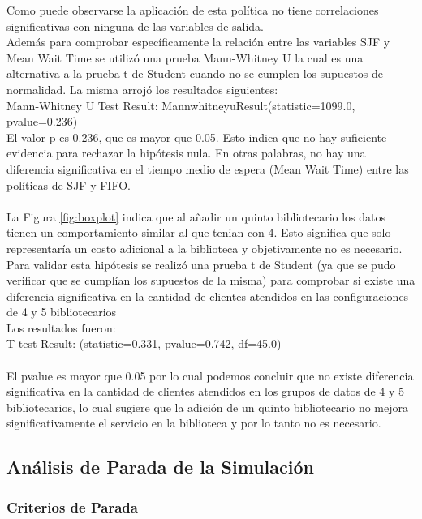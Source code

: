 \documentclass[10pt,twocolumn]{article}
\begin{document}
 Como puede observarse la aplicación de esta política no tiene correlaciones significativas con ninguna de las variables de salida. \\
Además para comprobar específicamente la relación entre las variables SJF y Mean Wait Time se utilizó una prueba  Mann-Whitney U la cual es una alternativa a la prueba t de Student cuando no se cumplen los supuestos de normalidad. La misma arrojó los resultados siguientes:\\
Mann-Whitney U Test Result: MannwhitneyuResult(statistic=1099.0, pvalue=0.236) \\
El valor p es 0.236, que es mayor que 0.05. Esto indica que no hay suficiente evidencia para rechazar la hipótesis nula. En otras palabras, no hay una diferencia significativa en el tiempo medio de espera (Mean Wait Time) entre las políticas de SJF y FIFO.\\
\\
La Figura \ref{fig:boxplot} indica que al añadir un quinto bibliotecario los datos tienen un comportamiento similar al que tenian con 4. Esto significa que solo representaría un costo adicional a la biblioteca y objetivamente no es necesario. Para validar esta hipótesis se realizó una prueba t de Student (ya que se pudo verificar que se cumplían los supuestos de la misma) para comprobar si existe una diferencia significativa en la cantidad de clientes atendidos en las configuraciones de 4 y 5 bibliotecarios\\
Los resultados fueron:\\
T-test Result: (statistic=0.331, pvalue=0.742, df=45.0)\\
\\
El pvalue es mayor que 0.05 por lo cual podemos concluir que no existe diferencia significativa en la cantidad de clientes atendidos en los grupos de datos de 4 y 5 bibliotecarios, lo cual sugiere que la adición de un quinto bibliotecario no mejora significativamente el servicio en la biblioteca y por lo tanto no es necesario.



\subsection{Análisis de Parada de la Simulación}

\subsubsection{Criterios de Parada}
\end{document}
